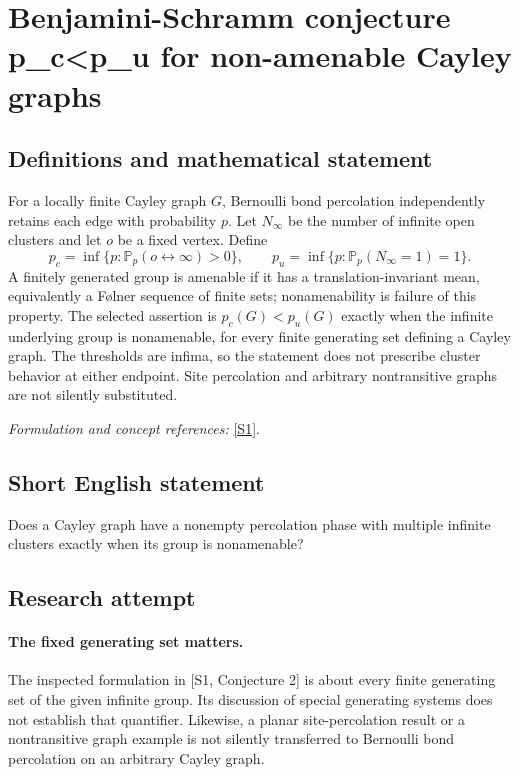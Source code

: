 \documentclass[11pt]{article}
\begin{document}
\section*{\texorpdfstring{Benjamini-Schramm conjecture p\_c<p\_u for non-amenable Cayley graphs}{Benjamini-Schramm conjecture p\_c<p\_u for non-amenable Cayley graphs}}\label{30006884}
\subsection{Definitions and mathematical statement}
For a locally finite Cayley graph $G$, Bernoulli bond percolation independently retains each edge with probability $p$. Let $N_\infty$ be the number of infinite open clusters and let $o$ be a fixed vertex. Define
\[
 p_c=\inf\{p:{\mathbb{P}}_p(o\leftrightarrow\infty)>0\},\qquad
 p_u=\inf\{p:{\mathbb{P}}_p(N_\infty=1)=1\}.
\]
A finitely generated group is amenable if it has a translation-invariant mean, equivalently a F\o lner sequence of finite sets; nonamenability is failure of this property. The selected assertion is $p_c(G)<p_u(G)$ exactly when the infinite underlying group is nonamenable, for every finite generating set defining a Cayley graph. The thresholds are infima, so the statement does not prescribe cluster behavior at either endpoint. Site percolation and arbitrary nontransitive graphs are not silently substituted.
\par\smallskip\textit{Formulation and concept references:} \href{https://ar5iv.labs.arxiv.org/html/1712.04651}{[S1]}.

\subsection{Short English statement}
Does a Cayley graph have a nonempty percolation phase with multiple infinite clusters exactly when its group is nonamenable?
\subsection{Research attempt}
\paragraph{The fixed generating set matters.}
The inspected formulation in [S1, Conjecture 2] is about every
finite generating set of the given infinite group. Its discussion
of special generating systems does not establish that quantifier.
Likewise, a planar site-percolation result or a nontransitive graph
example is not silently transferred to Bernoulli bond percolation
on an arbitrary Cayley graph.
\end{document}
